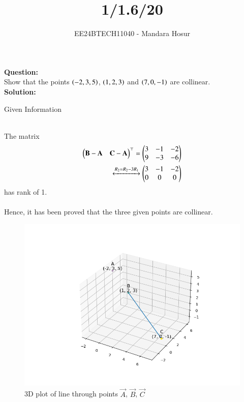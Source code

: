 \documentclass[journal]{IEEEtran}
\begin{document}

\vspace{3cm}

\title{1/1.6/20}
\author{EE24BTECH11040 - Mandara Hosur}
{\let\newpage\relax\maketitle}

\renewcommand{\thefigure}{\theenumi}
\renewcommand{\thetable}{\theenumi}
\setlength{\intextsep}{10pt} %


\renewcommand{\thetable}{\theenumi}


\textbf{Question:}\\
Show that the points $\left(-2,3,5\right)$, $\left(1,2,3\right)$ and $\left(7,0,-1\right)$ are collinear.
\\
\textbf{Solution:}\begin{table}[h!]    
  \centering
  
  \caption{Given Information}
  \label{Table 1}
\end{table} \\

The matrix 
\begin{align}
\begin{pmatrix}\mathbf{B}-\mathbf{A} & \mathbf{C}-\mathbf{A}\end{pmatrix}^\top = \begin{pmatrix}3 & -1 & -2 \\ 
                                                        9 & -3 & -6\end{pmatrix} \\
      \xleftrightarrow[]{R_2 = R_2 - 3R_1}
	 \begin{pmatrix}3 & -1 & -2 \\ 0 & 0 & 0\end{pmatrix}
\end{align}
has rank of 1. \\ \\
Hence, it has been proved that the three given points are collinear. 

\begin{figure}[h]
    \centering
    \includegraphics[width=\columnwidth]{figs/fig.png}
    \caption{3D plot of line through points $\vec{A}$, $\vec{B}$, $\vec{C}$}
 \end{figure}
\end{document}
